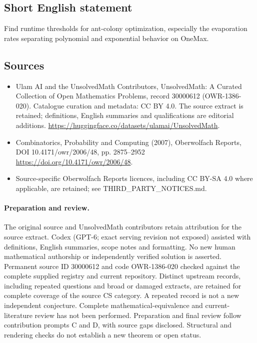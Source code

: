 \documentclass[11pt]{article}
\begin{document}
\subsection{Short English statement}
Find runtime thresholds for ant-colony optimization, especially the evaporation rates separating polynomial and exponential behavior on OneMax.
\subsection{Sources}
\begin{itemize}
\item[\hypertarget{source:30000612:1}{S1}] Ulam AI and the UnsolvedMath Contributors, UnsolvedMath: A Curated Collection of Open Mathematics Problems, record 30000612 (OWR-1386-020). Catalogue curation and metadata: CC BY 4.0. The source extract is retained; definitions, English summaries and qualifications are editorial additions.
\url{https://huggingface.co/datasets/ulamai/UnsolvedMath}.
\item[\hypertarget{source:30000612:2}{S2}] Combinatorics, Probability and Computing (2007), Oberwolfach Reports, DOI 10.4171/owr/2006/48, pp. 2875--2952
\url{https://doi.org/10.4171/owr/2006/48}.
\item Source-specific Oberwolfach Reports licences, including CC BY-SA 4.0 where applicable, are retained; see THIRD\_PARTY\_NOTICES.md.
\end{itemize}
\paragraph{Preparation and review.}
The original source and UnsolvedMath contributors retain attribution for the source extract. Codex (GPT-6; exact serving revision not exposed) assisted with definitions, English summaries, scope notes and formatting. No new human mathematical authorship or independently verified solution is asserted. Permanent source ID 30000612 and code OWR-1386-020 checked against the complete supplied registry and current repository. Distinct upstream records, including repeated questions and broad or damaged extracts, are retained for complete coverage of the source CS category. A repeated record is not a new independent conjecture. Complete mathematical-equivalence and current-literature review has not been performed. Preparation and final review follow contribution prompts C and D, with source gaps disclosed. Structural and rendering checks do not establish a new theorem or open status.
\label{end:30000612}
\end{document}
